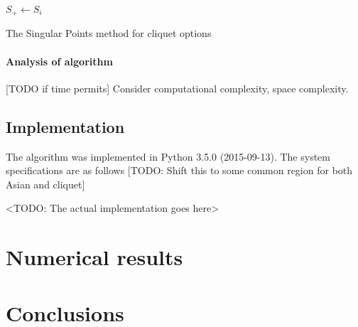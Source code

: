 \begin{algorithm}[H]
{{			
			
			$ S_+ \leftarrow S_i $ \;
		}
	}
	
	\caption{The Singular Points method for cliquet options}
\end{algorithm}

\paragraph{Analysis of algorithm}
[TODO if time permits] Consider computational complexity, space complexity.


\subsection{Implementation}
The algorithm was implemented in Python 3.5.0 (2015-09-13).
The system specifications are as follows
[TODO: Shift this to some common region for both Asian and cliquet]

<TODO: The actual implementation goes here>


\section{Numerical results}
\label{sec:sp-clq-results}


\section{Conclusions}


